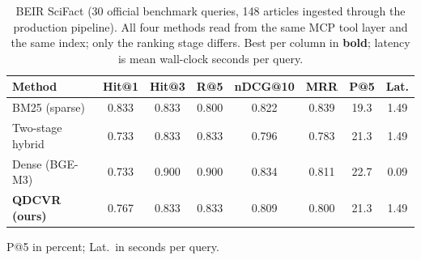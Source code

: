 \begin{table}[t]
\centering
\footnotesize
\setlength{\tabcolsep}{3.4pt}
\caption{BEIR SciFact (30 official benchmark queries, 148 articles ingested through
the production pipeline). All four methods read from the same MCP tool layer and the
same index; only the ranking stage differs. Best per column in \textbf{bold};
latency is mean wall-clock seconds per query.}
\label{tab:scifact}
\begin{tabular}{@{}lccccccc@{}}
\toprule
Method & Hit@1 & Hit@3 & R@5 & nDCG@10 & MRR & P@5 & Lat. \\
\midrule
BM25 (sparse) & 0.833 & 0.833 & 0.800 & 0.822 & 0.839 & 19.3 & 1.49 \\
Two-stage hybrid & 0.733 & 0.833 & 0.833 & 0.796 & 0.783 & 21.3 & 1.49 \\
Dense (BGE-M3) & 0.733 & 0.900 & 0.900 & 0.834 & 0.811 & 22.7 & 0.09 \\
\textbf{QDCVR (ours)} & 0.767 & 0.833 & 0.833 & 0.809 & 0.800 & 21.3 & 1.49 \\
\bottomrule
\end{tabular}

\vspace{2pt}
\parbox{\columnwidth}{\scriptsize P@5 in percent; Lat.\ in seconds per query.}
\end{table}

